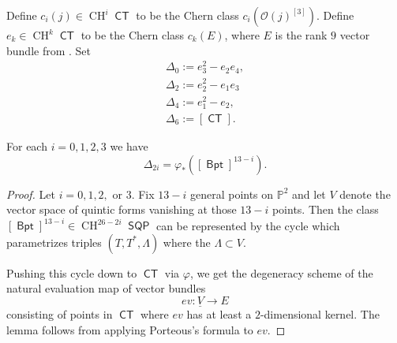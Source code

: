 \documentclass{article}
\renewcommand{\P}{\mathbb{P}}
\DeclareMathOperator{\I}{\mathcal{I}}
\renewcommand{\O}{\mathcal{O}}
\DeclareMathOperator{\CT}{\mathsf{CT}}
\DeclareMathOperator{\SQP}{\mathsf{SQP}}
\DeclareMathOperator{\CH}{CH}
\DeclareMathOperator{\BP}{\mathsf{Bpt}}
\DeclareMathOperator{\Lin}{\mathsf{Lin}}
\begin{document}

\begin{definition}
    Define $c_{i}(j) \in \CH^{i}\CT$ to be the Chern class $c_{i}\left(\O(j)^{[3]}\right)$. Define $e_k \in \CH^{k}\CT$ to be the Chern class $c_{k}(E)$, where $E$ is the rank $9$ vector bundle from .  Set 
    \begin{align}
        \Delta_{0}:= e_{3}^2-e_{2}e_{4},\\
        \Delta_{2}:= e_{2}^{2}-e_{1}e_{3}\\
        \Delta_{4}:= e_{1}^{2}-e_{2},\\
        \Delta_{6} := [\CT].
    \end{align}
    \end{definition}

    \begin{lemma}
        \label{lemma:Deltas}
        For each $i=0,1,2,3$ we have \[ \Delta_{2i} = \varphi_{*}\left( [\BP]^{13-i}\right).\]
    \end{lemma}

    \begin{proof}
        Let $i=0,1,2,$ or $3$. Fix $13-i$ general points on $\P^{2}$ and let $V$ denote the vector space of quintic forms vanishing at those $13-i$ points. Then the class $[\BP]^{13-i} \in \CH^{26-2i}\SQP$ can be represented by the cycle which parametrizes triples $(T,T^{*},\Lambda)$ where the  $\Lambda \subset V$. 

        Pushing this cycle down to $\CT$ via $\varphi$, we get the degeneracy scheme of the natural evaluation map of vector bundles \[ev: \underline{V} \to E\] consisting of points in $\CT$ where $ev$ has at least a $2$-dimensional kernel. The lemma follows from applying Porteous's formula to $ev$.
    \end{proof}
\end{document}
